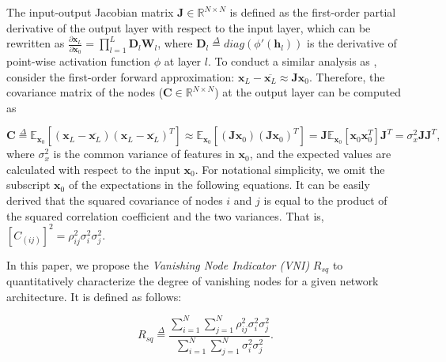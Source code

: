 The input-output Jacobian matrix $\mathbf{J}\in\mathbb{R}^{N\times N}$  is defined as the first-order partial derivative of the output layer with respect to the input layer, which can be rewritten as $\frac{\partial\mathbf{x}_L}{\partial\mathbf{x}_0}=\prod_{l=1}^{L}\mathbf{D}_l\mathbf{W}_l$,
where $\mathbf{D}_l\overset{\Delta}{=} diag(\phi'(\mathbf{h}_l))$ is the derivative of point-wise activation function $\phi$ at layer $l$.
To conduct a similar analysis as \cite{mft:linear}, consider the first-order forward approximation:
$\mathbf{x}_L-\overline{\mathbf{x}_L} \approx \mathbf{Jx}_0$. Therefore, the covariance matrix of the nodes ($\mathbf{C}\in\mathbb{R}^{N\times N}$) at the output layer  can be computed as

\begin{equation}
    \mathbf{C} \overset{\Delta}{=}
    \mathbb{E}_{\mathbf{x}_0}[(\mathbf{x}_L-\overline{\mathbf{x}_L})(\mathbf{x}_L-\overline{\mathbf{x}_L})^T]
    \approx
    \mathbb{E}_{\mathbf{x}_0}[(\mathbf{Jx}_0)(\mathbf{Jx}_0)^T]
    =
    \mathbf{J}\mathbb{E}_{\mathbf{x}_0}[\mathbf{x}_0\mathbf{x}_0^T]\mathbf{J}^T
    =
    \sigma_x^2\mathbf{J}\mathbf{J}^T,
    \label{covariance_eqn}
\end{equation}
where $\sigma_x^2$ is the common variance of features in $\mathbf{x}_0$, and the expected values are calculated with respect to the input $\mathbf{x}_0$. For notational simplicity, we omit the subscript $\mathbf{x}_0$ of the expectations in the following equations. 
It can be easily derived that the squared covariance of nodes $i$ and $j$ is equal to the product of the squared correlation coefficient and the two variances. That is, $[C_{(ij)}]^2=\rho_{ij}^2\sigma_i^2\sigma_j^2$.

In this paper, we propose the \textit{Vanishing Node Indicator (VNI)} $R_{sq}$ to quantitatively characterize the degree of vanishing nodes for a given network architecture. It is defined as follows:

\begin{equation}
    R_{sq}\overset{\Delta}{=}
    \frac{\sum_{i=1}^N\sum_{j=1}^N\rho_{ij}^2\sigma_i^2\sigma_j^2}
{\sum_{i=1}^N\sum_{j=1}^N\sigma_i^2\sigma_j^2}.
\label{rsq_def}
\end{equation}

